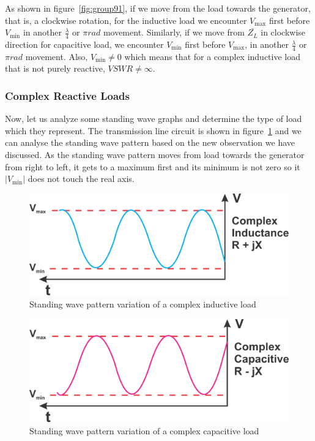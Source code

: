 As shown in figure~\ref{fig:group91}, if we move from the load towards the generator, that is, a clockwise rotation, for the inductive load we encounter $V_\max$ first before ${V_\min}$ in another $\frac{\lambda}{4}$ or $\pi rad$ movement. Similarly, if we move from $\bar{Z_L}$ in clockwise direction for capacitive load, we encounter $V_\min$ first before $V_\max$, in another $\frac{\lambda}{4}$ or $\pi rad$ movement. Also, $V_\min\neq0$ which means that for a complex inductive load that is not purely reactive, $VSWR\neq\infty$.

\subsubsection{Complex Reactive Loads}
Now, let us analyze some standing wave graphs and determine the type of load which they represent. The transmission line circuit is shown in figure~\ref{fig:group93} and we can analyse the standing wave pattern based on the new observation we have discussed. As the standing wave pattern moves from load towards the generator from right to left, it gets to a maximum first and its minimum is not zero so it $|V_\min|$ does not touch the real axis.
\begin{figure}[h]
\centering
\includegraphics[scale=0.5]{./graphics/Group93}
\caption{Standing wave pattern variation of a complex inductive load}
\label{fig:group93}
\end{figure}
\begin{figure}[h]
\centering
\includegraphics[scale=0.5]{./graphics/Group94}
\caption{Standing wave pattern variation of a complex capacitive load}
\label{fig:group94}
\end{figure}

